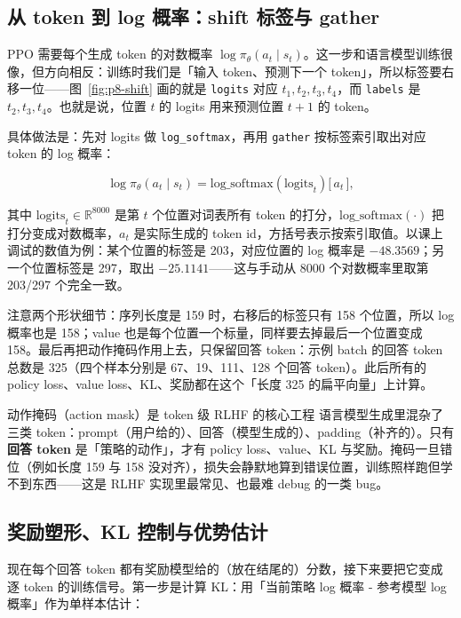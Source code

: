 \subsection{从 token 到 log 概率：shift 标签与 gather}

PPO 需要每个生成 token 的对数概率 $\log \pi_\theta(a_t\mid s_t)$。这一步和语言模型训练很像，但方向相反：训练时我们是「输入 token、预测下一个 token」，所以标签要右移一位——图~\ref{fig:p8-shift} 画的就是 \texttt{logits} 对应 $t_1,t_2,t_3,t_4$，而 \texttt{labels} 是 $t_2,t_3,t_4$。也就是说，位置 $t$ 的 logits 用来预测位置 $t+1$ 的 token。

具体做法是：先对 logits 做 \texttt{log\_softmax}，再用 \texttt{gather} 按标签索引取出对应 token 的 log 概率：

$$
\log \pi_\theta(a_t \mid s_t) = \mathrm{log\_softmax}(\mathrm{logits}_t)\big[\,a_t\,\big],
$$

其中 $\mathrm{logits}_t \in \mathbb{R}^{8000}$ 是第 $t$ 个位置对词表所有 token 的打分，$\mathrm{log\_softmax}(\cdot)$ 把打分变成对数概率，$a_t$ 是实际生成的 token id，方括号表示按索引取值。以课上调试的数值为例：某个位置的标签是 203，对应位置的 log 概率是 $-48.3569$；另一个位置标签是 297，取出 $-25.1141$——这与手动从 8000 个对数概率里取第 203/297 个完全一致。

注意两个形状细节：序列长度是 159 时，右移后的标签只有 158 个位置，所以 log 概率也是 158；value 也是每个位置一个标量，同样要去掉最后一个位置变成 158。最后再把动作掩码作用上去，只保留回答 token：示例 batch 的回答 token 总数是 325（四个样本分别是 67、19、111、128 个回答 token）。此后所有的 policy loss、value loss、KL、奖励都在这个「长度 325 的扁平向量」上计算。

\begin{importantbox}{动作掩码（action mask）是 token 级 RLHF 的核心工程}
语言模型生成里混杂了三类 token：prompt（用户给的）、回答（模型生成的）、padding（补齐的）。只有\textbf{回答 token} 是「策略的动作」，才有 policy loss、value、KL 与奖励。掩码一旦错位（例如长度 159 与 158 没对齐），损失会静默地算到错误位置，训练照样跑但学不到东西——这是 RLHF 实现里最常见、也最难 debug 的一类 bug。
\end{importantbox}

\subsection{奖励塑形、KL 控制与优势估计}

现在每个回答 token 都有奖励模型给的（放在结尾的）分数，接下来要把它变成逐 token 的训练信号。第一步是计算 KL：用「当前策略 log 概率 - 参考模型 log 概率」作为单样本估计：

